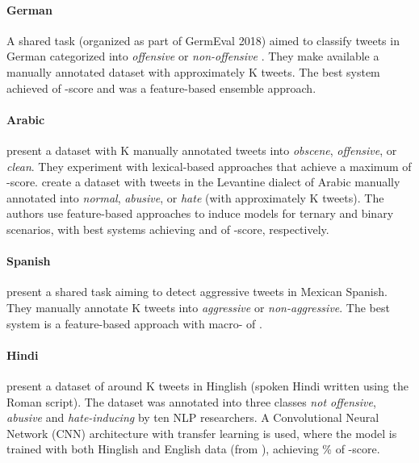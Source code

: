\documentclass[11pt,a4paper]{article}
\begin{document}
\paragraph{German} A shared task (organized as part of GermEval 2018) aimed to classify tweets in German categorized into \textit{offensive} or \textit{non-offensive} \cite{wiegand-etal-2018-germeval}. They make available a manually annotated dataset with approximately K tweets. The best system achieved  of -score and was a feature-based ensemble approach.

\paragraph{Arabic}  present a dataset with K manually annotated tweets into \textit{obscene}, \textit{offensive}, or \textit{clean}. They experiment with lexical-based approaches that achieve a maximum of  -score.  create a dataset with tweets in the Levantine dialect of Arabic manually annotated into \textit{normal}, \textit{abusive}, or \textit{hate} (with approximately K tweets). The authors use feature-based approaches to induce models for ternary and binary scenarios, with best systems achieving  and  of -score, respectively. 

\paragraph{Spanish}  present a shared task aiming to detect aggressive tweets in Mexican Spanish. They manually annotate K tweets into \textit{aggressive} or \textit{non-aggressive}. The best system is a feature-based approach with macro- of .

\paragraph{Hindi}  present a dataset of around K tweets in Hinglish (spoken Hindi written using the Roman script). The dataset was annotated into three classes \textit{not offensive}, \textit{abusive} and \textit{hate-inducing} by ten NLP researchers. A Convolutional Neural Network (CNN) architecture with transfer learning is used, where the model is trained with both Hinglish and English data (from \cite{davidson-etal-2017}), achieving \% of -score.
\end{document}
